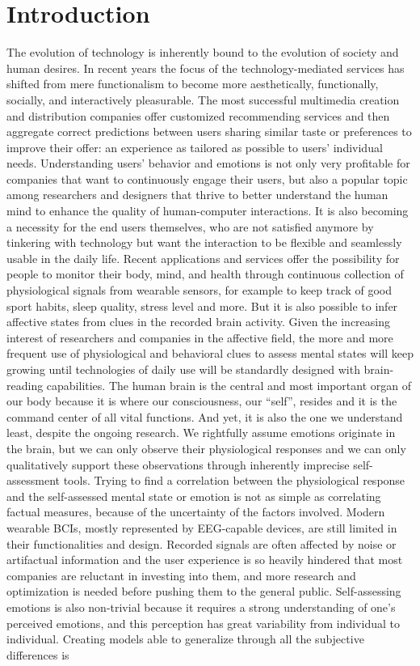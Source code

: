 \chapter{Introduction}
\label{chap:introduction}

The evolution of technology is inherently bound to the evolution of society and human desires. In recent years the focus of the technology-mediated services has shifted from mere functionalism to become more aesthetically, functionally, socially, and interactively pleasurable. The most successful multimedia creation and distribution companies offer customized recommending services and then aggregate correct predictions between users sharing similar taste or preferences to improve their offer: an experience as tailored as possible to users' individual needs. Understanding users’ behavior and emotions is not only very profitable for companies that want to continuously engage their users, but also a popular topic among researchers and designers that thrive to better understand the human mind to enhance the quality of human-computer interactions. It is also becoming a necessity for the end users themselves, who are not satisfied anymore by tinkering with technology but want the interaction to be flexible and seamlessly usable in the daily life. Recent applications and services offer the possibility for people to monitor their body, mind, and health through continuous collection of physiological signals from wearable sensors, for example to keep track of good sport habits, sleep quality, stress level and more. But it is also possible to infer affective states from clues in the recorded brain activity. Given the increasing interest of researchers and companies in the affective field, the more and more frequent use of physiological and behavioral clues to assess mental states will keep growing until technologies of daily use will be standardly designed with brain-reading capabilities. The human brain is the central and most important organ of our body because it is where our consciousness, our “self”, resides and it is the command center of all vital functions. And yet, it is also the one we understand least, despite the ongoing research. We rightfully assume emotions originate in the brain, but we can only observe their physiological responses and we can only qualitatively support these observations through inherently imprecise self-assessment tools. Trying to find a correlation between the physiological response and the self-assessed mental state or emotion is not as simple as correlating factual measures, because of the uncertainty of the factors involved. Modern wearable \ac{BCIs}, mostly represented by EEG-capable devices, are still limited in their functionalities and design. Recorded signals are often affected by noise or artifactual information and the user experience is so heavily hindered that most companies are reluctant in investing into them, and more research and optimization is needed before pushing them to the general public. Self-assessing emotions is also non-trivial because it requires a strong understanding of one’s perceived emotions, and this perception has great variability from individual to individual. Creating models able to generalize through all the subjective differences is 